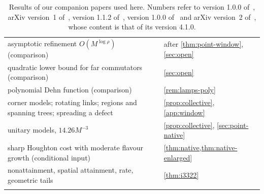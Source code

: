{\begin{longtable}{@{}L{0.45\textwidth}L{0.21\textwidth}L{0.26\textwidth}@{}}
asymptotic refinement $O(M^{\log\rho})$ (comparison) & \cite[Rem.~A.3]{DM-H3} & after \cref{thm:point-window}, \cref{sec:open}\\
quadratic lower bound for far commutators (comparison) & \cite[Prop.~3.4]{DM-H3} & \cref{sec:open}\\
polynomial Dehn function (comparison) & \cite[Thm.~3.3]{DM-H3} & \cref{rem:lamps-poly}\\
corner models; rotating links; regions and spanning trees; spreading a defect & \cite[Prop.~6.1, Lemmas~6.3, 6.4, proof of Prop.~6.5]{DM-H3} & \cref{prop:collective}, \cref{app:window}\\
unitary models, $14.26M^{-3}$ & \cite[Prop.~6.5]{DM-H3} & \cref{prop:collective}, \cref{sec:point-native}\\
\midrule
sharp Houghton cost with moderate flavour growth (conditional input) & \cite[App.~R]{DM-ID} & \cref{thm:native,thm:native-enlarged}\\
\midrule
nonattainment, spatial attainment, rate, geometric tails & \cite[Thms.~1, 2, 6, \S5.2]{Dou26} & \cref{thm:i3322}\\
\bottomrule
\caption{Results of our companion papers used here. Numbers refer to version 1.0.0 of~\cite{DM-game}, arXiv version~1 of~\cite{DM-lamps}, version 1.1.2
of~\cite{DM-H3}, version 1.0.0 of~\cite{DM-ID} and arXiv version~2 of~\cite{Dou26}, whose content is that of its version 4.1.0.}\label{tab:companion}
\end{longtable}}
